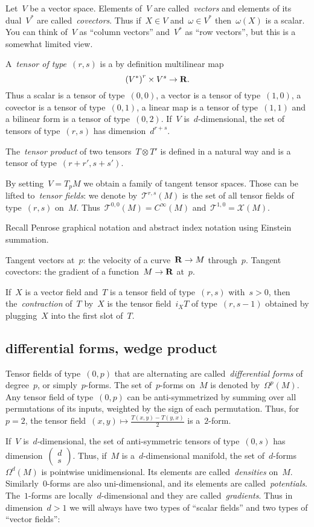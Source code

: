 Let~$V$ be a vector space.  Elements of~$V$ are called~\emph{vectors} and
elements of its dual~$V^*$ are called~\emph{covectors}.
Thus if~$X\in V$ and~$\omega\in V^*$ then~$\omega(X)$ is a scalar.
You can think of~$V$ as ``column vectors'' and~$V^*$ as ``row vectors'', but
this is a somewhat limited view.

A~\emph{tensor of type~$(r,s)$} is a by definition multilinear map
\[
	\left(V^*\right)^r\times V^s\to\mathbf{R}.
\]
Thus a scalar is a tensor of type~$(0,0)$, a vector is a tensor of
type~$(1,0)$, a covector is a tensor of type~$(0,1)$, a linear map is a
tensor of type~$(1,1)$ and a bilinear form is a tensor of type~$(0,2)$.
If~$V$ is~$d$-dimensional, the set of tensors of type~$(r,s)$ has
dimension~$d^{r+s}$.

The~\emph{tensor product} of two tensors~$T\otimes T'$ is defined in a natural
way and is a tensor of type~$(r+r',s+s')$.

By setting~$V=T_pM$ we obtain a family of tangent tensor spaces.  Those can
be lifted to~\emph{tensor fields}: we denote by~$\mathcal{T}^{r,s}(M)$ is the
set of all tensor fields of type~$(r,s)$ on~$M$.
Thus~$\mathcal{T}^{0,0}(M)=C^\infty(M)$
and~$\mathcal{T}^{1,0}=\mathcal{X}(M)$.

Recall Penrose graphical notation and abstract index notation using Einstein
summation.

Tangent vectors at~$p$: the velocity of a curve~$\mathbf{R}\to M$
through~$p$.  Tangent covectors: the gradient of a function~$M\to\mathbf{R}$ at~$p$.

If~$X$ is a vector field and~$T$ is a tensor field of type~$(r,s)$
with~$s>0$, then the~\emph{contraction} of~$T$ by~$X$ is the tensor
field~$i_XT$ of
type~$(r,s-1)$ obtained by plugging~$X$ into the first slot of~$T$.

\subsection{differential forms, wedge product}

Tensor fields of type~$(0,p)$ that are alternating are
called~\emph{differential forms} of degree~$p$, or simply~$p$-forms.
The set of~$p$-forms on~$M$ is denoted by~$\Omega^p(M)$.
Any tensor field of type~$(0,p)$ can be anti-symmetrized by summing over all
permutations of its inputs, weighted by the sign of each permutation.  Thus,
for~$p=2$, the tensor field~$(x,y)\mapsto\frac{T(x,y)-T(y,x)}2$ is
a~$2$-form.

If~$V$ is~$d$-dimensional, the set of anti-symmetric tensors of type~$(0,s)$ has
dimension~$\begin{pmatrix}d\\s\end{pmatrix}$.  Thus, if~$M$ is
a~$d$-dimensional manifold, the set of~$d$-forms~$\Omega^d(M)$ is pointwise
unidimensional.  Its elements are called~\emph{densities} on~$M$.
Similarly~$0$-forms are also uni-dimensional, and its elements are
called~\emph{potentials}.  The~$1$-forms are locally~$d$-dimensional and they
are called~\emph{gradients}.  Thus in dimension~$d>1$ we will always have two
types of ``scalar fields'' and two types of ``vector fields'':

